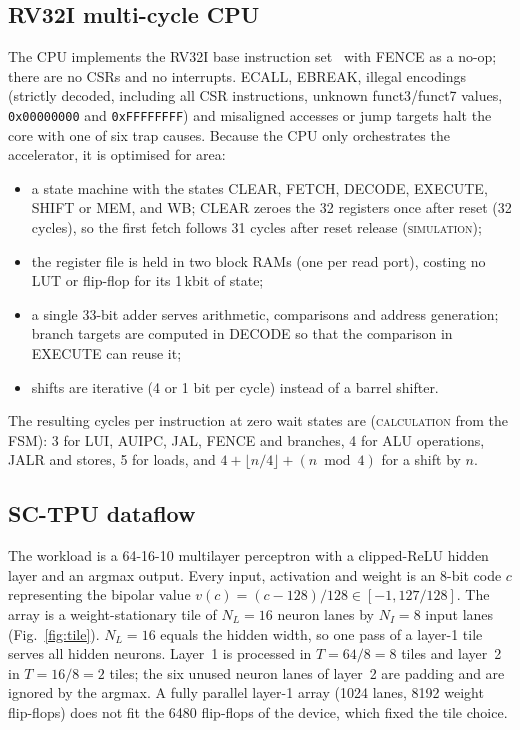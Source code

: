 \documentclass[conference]{IEEEtran}
\newcommand{\NL}{N_{L}}              %
\newcommand{\IL}{N_{I}}              %
\newcommand{\lbl}[1]{\textsc{#1}}    %
\begin{document}
\subsection{RV32I multi-cycle CPU}
The CPU implements the RV32I base instruction set~\cite{riscv2019unpriv} with
FENCE as a no-op; there are no CSRs and no interrupts. ECALL, EBREAK, illegal
encodings (strictly decoded, including all CSR instructions, unknown
funct3/funct7 values, \texttt{0x00000000} and \texttt{0xFFFFFFFF}) and
misaligned accesses or jump targets halt the core with one of six trap
causes. Because the CPU only orchestrates the accelerator, it is optimised for
area:
\begin{itemize}
\item a state machine with the states CLEAR, FETCH, DECODE, EXECUTE,
  SHIFT or MEM, and WB; CLEAR zeroes the 32 registers once after reset
  (32 cycles), so the first fetch follows 31 cycles after reset release
  (\lbl{simulation});
\item the register file is held in two block RAMs (one per read port), costing
  no LUT or flip-flop for its 1\,kbit of state;
\item a single 33-bit adder serves arithmetic, comparisons and address
  generation; branch targets are computed in DECODE so that the comparison in
  EXECUTE can reuse it;
\item shifts are iterative (4 or 1 bit per cycle) instead of a barrel shifter.
\end{itemize}
The resulting cycles per instruction at zero wait states are
(\lbl{calculation} from the FSM): 3 for LUI, AUIPC, JAL, FENCE and branches,
4 for ALU operations, JALR and stores, 5 for loads, and
$4+\lfloor n/4\rfloor+(n \bmod 4)$ for a shift by $n$.

\subsection{SC-TPU dataflow}
The workload is a 64-16-10 multilayer perceptron with a clipped-ReLU hidden
layer and an argmax output. Every input, activation and weight is an 8-bit
code $c$ representing the bipolar value $v(c)=(c-128)/128\in[-1,127/128]$.
The array is a weight-stationary tile of $\NL=16$ neuron lanes by $\IL=8$ input
lanes (Fig.~\ref{fig:tile}). $\NL=16$ equals the hidden width, so one pass of
a layer-1 tile serves all hidden neurons. Layer~1 is processed in
$T=64/8=8$ tiles and layer~2 in $T=16/8=2$ tiles; the six unused neuron lanes
of layer~2 are padding and are ignored by the argmax.
A fully parallel layer-1 array (1024 lanes, 8192 weight flip-flops) does not
fit the 6480 flip-flops of the device, which fixed the tile choice.
\end{document}
